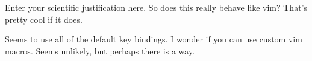 %
%
\justification          %

Enter your scientific justification here. So does this really behave like vim? That's pretty cool if it does.

Seems to use all of the default key bindings. I wonder if you can use custom vim macros. Seems unlikely, but perhaps there is a way.